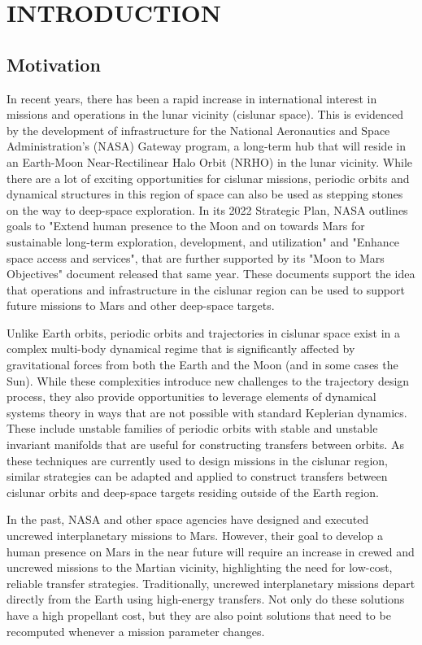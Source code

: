 \chapter{INTRODUCTION}
\section{Motivation}
In recent years, there has been a rapid increase in international interest in missions and
operations in the lunar vicinity (cislunar space). This is evidenced by the development of
infrastructure for the National Aeronautics and Space Administration's (NASA) Gateway program, a
long-term hub that will reside in an Earth-Moon Near-Rectilinear Halo Orbit (NRHO) in the lunar
vicinity\cite{Zamora:2024}. While there are a lot of exciting opportunities for cislunar missions,
periodic orbits and dynamical structures in this region of space can also be used as stepping
stones on the way to deep-space exploration. In its 2022 Strategic Plan, NASA outlines goals to "Extend human presence to the Moon and on
towards Mars for sustainable long-term exploration, development, and utilization" and "Enhance
space access and services"\cite{NASA:2022s}, that are further supported by its "Moon to Mars
Objectives" document released that same year\cite{NASA:2022m}. These documents support the idea
that operations and infrastructure in the cislunar region can be used to support future missions to
Mars and other deep-space targets.

Unlike Earth orbits, periodic orbits and trajectories in cislunar space exist in a complex
multi-body dynamical regime that is significantly affected by gravitational forces from both the
Earth and the Moon (and in some cases the Sun). While these complexities introduce new challenges
to the trajectory design process, they also provide opportunities to leverage elements of dynamical
systems theory in ways that are not possible with standard Keplerian dynamics. These include
unstable families of periodic orbits with stable and unstable invariant manifolds that are useful
for constructing transfers between orbits. As these techniques are currently used to design
missions in the cislunar region, similar strategies can be adapted and applied to construct
transfers between cislunar orbits and deep-space targets residing outside of the Earth region.

In the past, NASA and other space agencies have designed and executed uncrewed interplanetary
missions to Mars. However, their goal to develop a human presence on Mars in the near future will require an increase in crewed and uncrewed missions to the Martian vicinity,
highlighting the need for low-cost, reliable transfer strategies. Traditionally, uncrewed
interplanetary missions depart directly from the Earth using high-energy
transfers\cite{Drake:2009}. Not only do these solutions have a high propellant cost, but they are
also point solutions that need to be recomputed whenever a mission parameter
changes.

